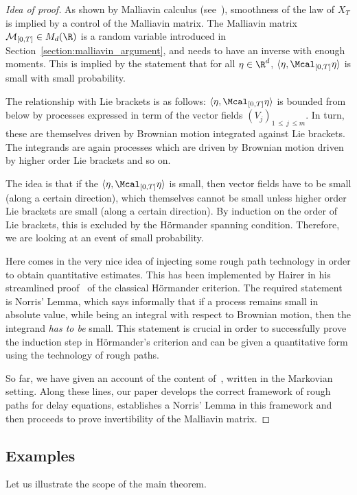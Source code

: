 \begin{proof}[Idea of proof]
As shown by Malliavin calculus (see~\cite{Nualart2006}), smoothness of the law of $X_T$ is implied by a control of the Malliavin matrix. The Malliavin matrix ${\mathcal{M}}_{[0,T]} \in M_d(\R)$ is a random variable introduced in Section~\ref{section:malliavin_argument}, and needs to have an inverse with enough moments. This is implied by the statement that for all $\eta \in \R^d$, $\langle \eta, \Mcal_{[0,T]} \eta \rangle$ is small with small probability.

The relationship with Lie brackets is as follows: $\langle \eta, \Mcal_{[0,T]} \eta \rangle$ is bounded from below by processes expressed in term of the vector fields $\left(V_j \right)_{1\,\leq\,j\,\leq m}$. In turn, these are themselves driven by Brownian motion integrated against Lie brackets. The integrands are again processes which are driven by Brownian motion driven by higher order Lie brackets and so on.

The idea is that if the $\langle \eta, \Mcal_{[0,T]} \eta \rangle$ is small, then vector fields have to be small (along a certain direction), which themselves cannot be small unless higher order Lie brackets are small (along a certain direction). By induction on the order of Lie brackets, this is excluded by the H\"ormander spanning condition. Therefore, we are looking at an event of small probability.

Here comes in the very nice idea of injecting some rough path technology in order to obtain quantitative estimates. This has been implemented by Hairer in his streamlined proof~\cite{Hairer11} of the classical H\"ormander criterion. The required statement is Norris' Lemma, which says informally that if a process remains small in absolute value, while being an integral with respect to Brownian motion, then the integrand \emph{has to be} small. This statement is crucial in order to successfully prove the induction step in H\"ormander's criterion and can be given a quantitative form using the technology of rough paths.

So far, we have given an account of the content of~\cite{Hairer11}, written in the Markovian setting. Along these lines, our paper develops the correct framework of rough paths for delay equations, establishes a Norris' Lemma in this framework and then proceeds to prove invertibility of the Malliavin matrix.
\end{proof}


\subsection{Examples}\label{subsection:examples}
Let us illustrate the scope of the main theorem.

